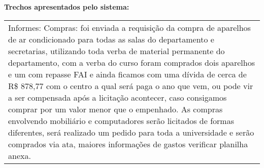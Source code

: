 \noindent
\textbf{Trechos apresentados pelo sistema:}
\begin{longtable}{|p{17.5cm}|}
\hline 
Informes: Compras: foi enviada a requisição da compra de aparelhos de ar condicionado para todas as salas do departamento e secretarias, utilizando toda verba de material permanente do departamento, com a verba do curso foram comprados dois aparelhos e um com repasse FAI e ainda ficamos com uma dívida de cerca de R\$ 878,77 com o centro a qual será paga o ano que vem, ou pode vir a ser compensada após a licitação acontecer, caso consigamos comprar por um valor menor que o empenhado. As compras envolvendo mobiliário e computadores serão licitados de formas diferentes, será realizado um pedido para toda a universidade e serão comprados via ata, maiores informações de gastos verificar planilha anexa.


\end{longtable}
